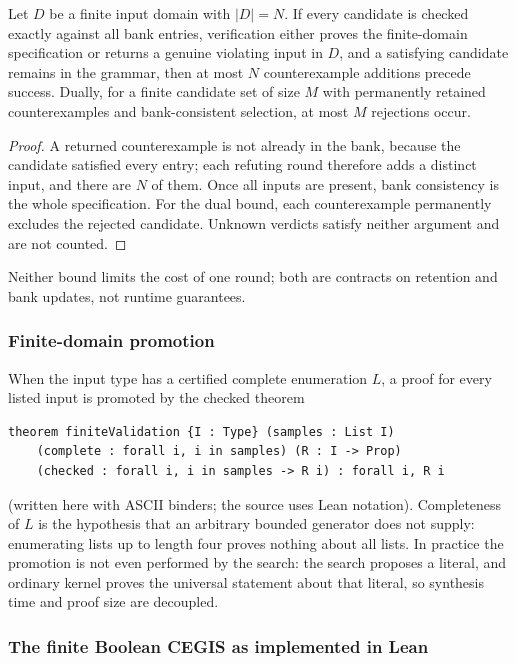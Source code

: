 \begin{proposition}
Let $D$ be a finite input domain with $|D|=N$. If every candidate is checked exactly against all bank entries, verification either proves the finite-domain specification or returns a genuine violating input in $D$, and a satisfying candidate remains in the grammar, then at most $N$ counterexample additions precede success. Dually, for a finite candidate set of size $M$ with permanently retained counterexamples and bank-consistent selection, at most $M$ rejections occur.
\end{proposition}
\begin{proof}
A returned counterexample is not already in the bank, because the candidate satisfied every entry; each refuting round therefore adds a distinct input, and there are $N$ of them. Once all inputs are present, bank consistency is the whole specification. For the dual bound, each counterexample permanently excludes the rejected candidate. Unknown verdicts satisfy neither argument and are not counted.
\end{proof}
Neither bound limits the cost of one round; both are contracts on retention and bank updates, not runtime guarantees.

\subsubsection{Finite-domain promotion}

When the input type has a certified complete enumeration $L$, a proof for every listed input is promoted by the checked theorem
\begin{lstlisting}
theorem finiteValidation {I : Type} (samples : List I)
    (complete : forall i, i in samples) (R : I -> Prop)
    (checked : forall i, i in samples -> R i) : forall i, R i
\end{lstlisting}
(written here with ASCII binders; the source uses Lean notation). Completeness of $L$ is the hypothesis that an arbitrary bounded generator does not supply: enumerating lists up to length four proves nothing about all lists. In practice the promotion is not even performed by the search: the search proposes a literal, and ordinary kernel  proves the universal statement about that literal, so synthesis time and proof size are decoupled.

\subsubsection{The finite Boolean CEGIS as implemented in Lean}

